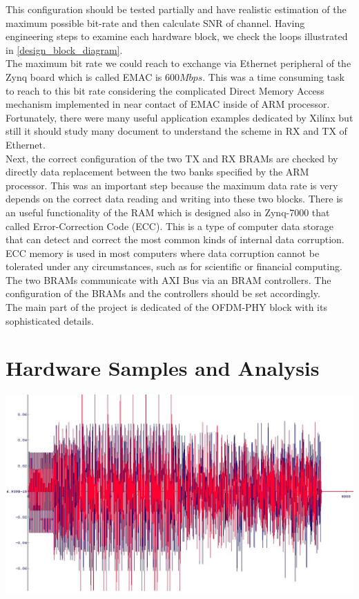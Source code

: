 This configuration should be tested partially and have realistic estimation of the maximum possible bit-rate and then calculate SNR of channel. Having engineering steps to examine each hardware block, we check the loops illustrated in \ref{design_block_diagram}.\\
The maximum bit rate we could reach to exchange via Ethernet peripheral of the Zynq board which is called EMAC is $600 Mbps$. This was a time consuming task to reach to this bit rate considering the complicated Direct Memory Access mechanism implemented in near contact of EMAC inside of ARM processor. Fortunately, there were many useful application examples dedicated by Xilinx but still it should study many document to understand the scheme in RX and TX of Ethernet.\\
Next, the correct configuration of the two TX and RX BRAMs are checked by directly data replacement between the two banks specified by the ARM processor. This was an important step because the maximum data rate is very depends on the correct data reading and writing into these two blocks. There is an useful functionality of the RAM which is designed also in Zynq-7000 that called Error-Correction Code (ECC). This is a type of computer data storage that can detect and correct the most common kinds of internal data corruption. ECC memory is used in most computers where data corruption cannot be tolerated under any circumstances, such as for scientific or financial computing. The two BRAMs communicate with AXI Bus via an BRAM controllers. The configuration of the BRAMs and the controllers should be set accordingly.\\
The main part of the project is dedicated of the OFDM-PHY block with its sophisticated details.\\

\section{Hardware Samples and Analysis}
\label{hw_samples}

\begin{center}
\includegraphics[width=\textwidth]{content/fig/ofdmframe_chipscope.JPG}
\label{ofdmframe_chipscope}
\end{center}

